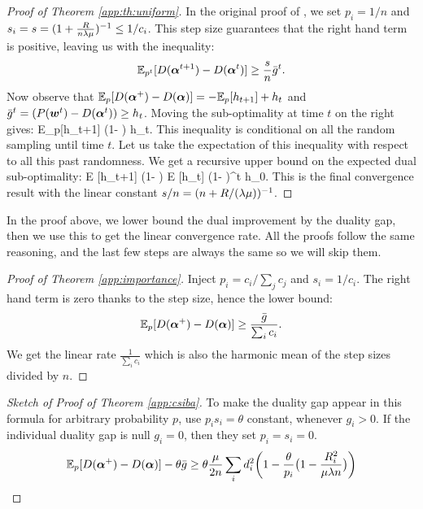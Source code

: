 \begin{subappendices}
	\begin{proof}[Proof of Theorem \ref{app:th:uniform}]
		In the original proof of \citet{shalev-shwartz_accelerated_2013-1}, we set $p_i=1/n$ and $s_i = s = (1+ \frac{R}{n \lambda \mu} )^{-1}  \leq 1/c_i$. This step size guarantees that the right hand term is positive, leaving us with the inequality:
		\begin{equation}
			\mathbb E_{p^t}[D(\boldsymbol{\alpha}^{t+1}) - D(\boldsymbol{\alpha}^t)]
			\geq \frac{s}{n} \bar g^t.
			\label{app:eq:uniform ascent lemma}
		\end{equation}
		Now observe that $\mathbb E_p[D(\boldsymbol{\alpha}^+) - D(\boldsymbol{\alpha})] = - \mathbb E_p[h_{t+1}] + h_t$ and $\bar g^t = (P(\boldsymbol{w}^t) - D(\boldsymbol{\alpha}^t)) \geq h_t$.
		Moving the sub-optimality at time $t$ on the right gives:
		\beq
		\mathbb E_p[h_{t+1}] \leq (1-  ) h_t.
		\eeq
		This inequality is conditional on all the random sampling until time $t$.
		Let us take the expectation of this inequality with respect to all this past randomness.
		We get a recursive upper bound on the expected dual sub-optimality:
		\beq
		\mathbb E [h_{t+1}] \leq (1-  ) \mathbb E [h_t] \leq (1-  )^t h_0.
		\eeq
		This is the final convergence result with the linear constant $s/n = (n+R/(\lambda \mu))^{-1}$.
	\end{proof}

	In the proof above, we lower bound the dual improvement by the duality gap, then we use this to get the linear convergence rate.
	All the proofs follow the same reasoning, and the last few steps are always the same so we will skip them.

	\begin{proof}[Proof of Theorem \ref{app:importance}]
		Inject $p_i=c_i/\sum_j c_j$ and $s_i = 1/c_i$. The right hand term is zero thanks to the step size, hence the lower bound:
		\begin{equation}
			\mathbb E_p[D(\boldsymbol{\alpha}^+) - D(\boldsymbol{\alpha})]
			\geq \frac{\bar g}{\sum_i c_i} .
		\end{equation}
		We get the linear rate   $\frac{1}{\sum_i c_i}$ which is also the harmonic mean of the step sizes divided by $n$.
	\end{proof}

	\begin{proof}[Sketch of Proof of Theorem \ref{app:csiba}]
		To make the duality gap appear in this formula for arbitrary probability $p$, \citet{csiba2015stochastic} use $p_i s_i = \theta$ constant, whenever $g_i > 0$.
		If the individual duality gap is null $g_i=0$, then they set $p_i=s_i=0$.
		\begin{equation}
			\mathbb E_p[D(\boldsymbol{\alpha}^+) - D(\boldsymbol{\alpha})] - \theta \bar g
			\geq \theta \frac{\mu}{2 n} \sum_i  d_i^2\bigg ( 1 -  \frac{\theta}{p_i} \big ( 1 - \frac{R_i^2}{\mu \lambda n} \big ) \bigg )
		\end{equation}


\end{proof}
\end{subappendices}
